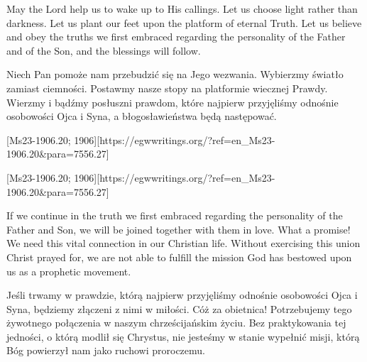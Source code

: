May the Lord help us to wake up to His callings. Let us choose light rather than darkness. Let us plant our feet upon the platform of eternal Truth. Let us believe and obey the truths we first embraced regarding the personality of the Father and of the Son, and the blessings will follow.


Niech Pan pomoże nam przebudzić się na Jego wezwania. Wybierzmy światło zamiast ciemności. Postawmy nasze stopy na platformie wiecznej Prawdy. Wierzmy i bądźmy posłuszni prawdom, które najpierw przyjęliśmy odnośnie osobowości Ojca i Syna, a błogosławieństwa będą następować.


[Ms23-1906.20; 1906][https://egwwritings.org/?ref=en\_Ms23-1906.20&para=7556.27]


[Ms23-1906.20; 1906][https://egwwritings.org/?ref=en\_Ms23-1906.20&para=7556.27]


If we continue in the truth we first embraced regarding the personality of the Father and Son, we will be joined together with them in love. What a promise! We need this vital connection in our Christian life. Without exercising this union Christ prayed for, we are not able to fulfill the mission God has bestowed upon us as a prophetic movement.


Jeśli trwamy w prawdzie, którą najpierw przyjęliśmy odnośnie osobowości Ojca i Syna, będziemy złączeni z nimi w miłości. Cóż za obietnica! Potrzebujemy tego żywotnego połączenia w naszym chrześcijańskim życiu. Bez praktykowania tej jedności, o którą modlił się Chrystus, nie jesteśmy w stanie wypełnić misji, którą Bóg powierzył nam jako ruchowi proroczemu.



